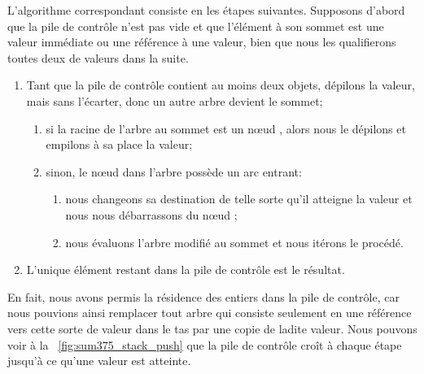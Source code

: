 L'algorithme correspondant consiste en les étapes suivantes. Supposons
d'abord que la pile de contrôle n'est pas vide et que l'élément à son
sommet est une valeur immédiate ou une référence à une valeur, bien
que nous les qualifierons toutes deux de valeurs dans la suite.
\begin{enumerate}

  \item Tant que la pile de contrôle contient au moins deux objets,
    dépilons la valeur, mais sans l'écarter, donc un autre arbre
    devient le sommet;
    \begin{enumerate}

    \item si la racine de l'arbre au sommet est un nœud ,
      alors nous le dépilons et empilons à sa place la valeur;

    \item sinon, le nœud  dans l'arbre possède un arc
      entrant:
      \begin{enumerate}

      \item nous changeons sa destination de telle sorte qu'il
        atteigne la valeur et nous nous débarrassons du nœud
        ;

      \item nous évaluons l'arbre modifié au sommet et nous itérons le
        procédé.

      \end{enumerate}

    \end{enumerate}

  \item L'unique élément restant dans la pile de contrôle est le résultat.

\end{enumerate}
En fait, nous avons permis la résidence des entiers dans la pile de
contrôle, car nous pouvions ainsi remplacer tout arbre qui consiste
seulement en une référence vers cette sorte de valeur dans le tas par
une copie de ladite valeur. Nous pouvons voir à la
\fig~\ref{fig:sum375_stack_push} que la pile de contrôle croît à
chaque étape jusqu'à ce qu'une valeur est atteinte.
 


